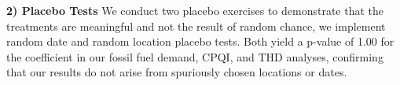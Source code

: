 \documentclass[sigconf,authordraft]{acmart}
\newcommand{\nb}[1]{\textcolor{blue}{NB[#1]}}
\begin{document}
\noindent\textbf{2) Placebo Tests}
We conduct two placebo exercises to demonstrate that the treatments are meaningful and not the result of random chance, we implement random date and random location placebo tests. Both yield a p-value of 1.00 for the coefficient in our fossil fuel demand, CPQI, and THD analyses, confirming that our results do not arise from spuriously chosen locations or dates.







\end{document}
